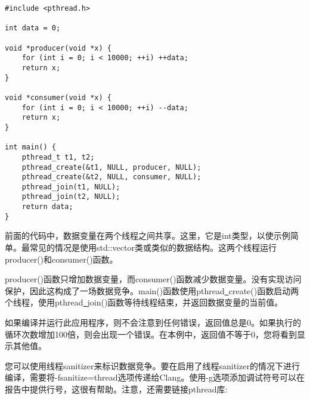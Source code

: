 \begin{lstlisting}[caption={}]
#include <pthread.h>

int data = 0;

void *producer(void *x) {
	for (int i = 0; i < 10000; ++i) ++data;
	return x;
}

void *consumer(void *x) {
	for (int i = 0; i < 10000; ++i) --data;
	return x;
}

int main() {
	pthread_t t1, t2;
	pthread_create(&t1, NULL, producer, NULL);
	pthread_create(&t2, NULL, consumer, NULL);
	pthread_join(t1, NULL);
	pthread_join(t2, NULL);
	return data;
}
\end{lstlisting}

前面的代码中，数据变量在两个线程之间共享。这里，它是int类型，以使示例简单。最常见的情况是使用std::vector类或类似的数据结构。这两个线程运行producer()和consumer()函数。\par

producer()函数只增加数据变量，而consumer()函数减少数据变量。没有实现访问保护，因此这构成了一场数据竞争。main()函数使用pthread\underline{~}create()函数启动两个线程，使用pthread\underline{~}join()函数等待线程结束，并返回数据变量的当前值。\par

如果编译并运行此应用程序，则不会注意到任何错误，返回值总是0。如果执行的循环次数增加100倍，则会出现一个错误。在本例中，返回值不等于0，您将看到显示其他值。\par

您可以使用线程sanitizer来标识数据竞争。要在启用了线程sanitizer的情况下进行编译，需要将-fsanitize=thread选项传递给Clang。使用-g选项添加调试符号可以在报告中提供行号，这很有帮助。注意，还需要链接pthread库:\par


